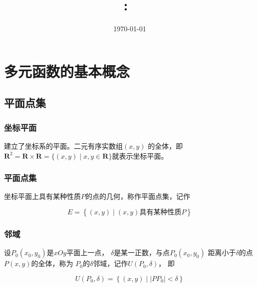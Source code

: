 \documentclass[12pt, a4paper]{article}
\title{
    \vspace{2in}
    \textmd{\textbf{\hmwkClass:\ \hmwkTitle}}\\
    \vspace{0.4in}
    \large{\textit{\myUniversiy}}
    \vspace{3in}
}
\author{\hmwkAuthorName}
\date{\today}
\numberwithin{equation}{section}
\begin{document}
\maketitle

\pagebreak


\tableofcontents

\pagebreak


\pagebreak

\section{多元函数的基本概念}

\subsection{平面点集}

\subsubsection{坐标平面}

    建立了坐标系的平面。二元有序实数组\(\left(x,y\right)\)
    的全体，即$\mathbf{R}^2=\mathbf{R} \times \mathbf{R}=\{(x, y) 
    \mid x, y \in \mathbf{R}\}$就表示坐标平面。

\subsubsection{平面点集}

    坐标平面上具有某种性质\(P\)的点的几何，称作平面点集，记作

    \[
        E = \left\{\left(x,y\right) \mid \left(x,y\right)
        \text{具有某种性质}P\right\}
    \]

\subsubsection{邻域}

    设\(P_{0}\left(x_0,y_0\right)\)是\(xOy\)平面上一点，
    \(\delta\)是某一正数，与点\(P_{0}\left(x_0,y_0\right)\)
    距离小于\(\delta\)的点\(P\left(x,y\right)\)的全体，称为
    \(P_{0}\)的\(\delta\)邻域，记作\(U\left(P_0,\delta\right)\)，
    即

    \[
        U\left(P_0,\delta\right) = \left\{\left(x,y\right)
        \mid \left|PP_0\right| < \delta\right\}
    \]
\end{document}
